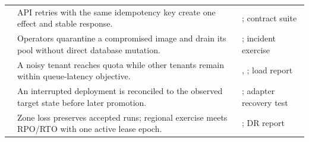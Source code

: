 \begin{longtable}{@{}L{0.14\textwidth}L{0.47\textwidth}L{0.30\textwidth}@{}}
 & API retries with the same idempotency key create one effect and stable response. & ; contract suite \\
 & Operators quarantine a compromised image and drain its pool without direct database mutation. & ; incident exercise \\
 & A noisy tenant reaches quota while other tenants remain within queue-latency objective. & , ; load report \\
 & An interrupted deployment is reconciled to the observed target state before later promotion. & ; adapter recovery test \\
 & Zone loss preserves accepted runs; regional exercise meets RPO/RTO with one active lease epoch. & ; DR report \\
\bottomrule
\end{longtable}

